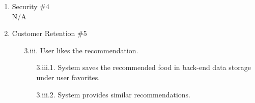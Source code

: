 \documentclass[]{article}
\begin{document}
\begin{enumerate}[{\bf BE1.}]
\begin{enumerate}[{\bf VP1.}]
				\item Security \#4 \\
					N/A
				\item Customer Retention \#5
					\begin{enumerate}
						\item[3.iii.] User likes the recommendation.
						\begin{enumerate}
							\item[3.iii.1.] System saves the recommended food in back-end data storage under user favorites.
							\item[3.iii.2.] System provides similar recommendations.
						\end{enumerate}
					\end{enumerate}
			\end{enumerate}
	

\end{enumerate}
\end{document}
